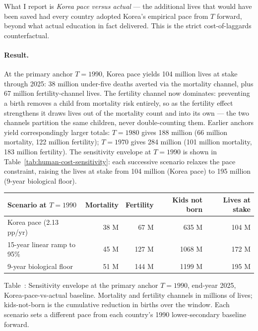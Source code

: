 \documentclass[12pt,letterpaper]{article}
\begin{document}
What I report is \emph{Korea pace versus actual} --- the additional
lives that would have been saved had every country adopted Korea's
empirical pace from $T$ forward, beyond what actual education in fact
delivered. This is the strict cost-of-laggards counterfactual.

\paragraph{Result.} At the primary anchor $T = 1990$, Korea pace
yields 104 million lives at stake through 2025: 38 million under-five
deaths averted via the mortality channel, plus 67 million
fertility-channel lives. The fertility channel now dominates:
preventing a birth removes a child from mortality risk entirely, so
as the fertility effect strengthens it draws lives out of the
mortality count and into its own --- the two channels partition the
same children, never double-counting them. Earlier anchors yield
correspondingly larger totals: $T = 1980$ gives 188 million (66
million mortality, 122 million fertility); $T = 1970$ gives 284
million (101 million mortality, 183 million fertility). The
sensitivity envelope at $T = 1990$ is shown in
Table~\ref{tab:human-cost-sensitivity}: each successive scenario
relaxes the pace constraint, raising the lives at stake from 104
million (Korea pace) to 195 million (9-year biological floor).

\begin{center}
\small
\begin{tabular}{@{}lrrrr@{}}
\toprule
Scenario at $T=1990$ & Mortality & Fertility & Kids not born & Lives at stake \\
\midrule
Korea pace (2.13 pp/yr)        &  38 M &  67 M &  635 M & 104 M \\
15-year linear ramp to 95\%    &  45 M & 127 M & 1068 M & 172 M \\
9-year biological floor        &  51 M & 144 M & 1199 M & 195 M \\
\bottomrule
\end{tabular}
\end{center}

\label{tab:human-cost-sensitivity}Table~\thetable: Sensitivity envelope at the primary anchor $T = 1990$, end-year 2025, Korea-pace-vs-actual baseline. Mortality and fertility channels in millions of lives; kids-not-born is the cumulative reduction in births over the window. Each scenario sets a different pace from each country's 1990 lower-secondary baseline forward.
\end{document}
